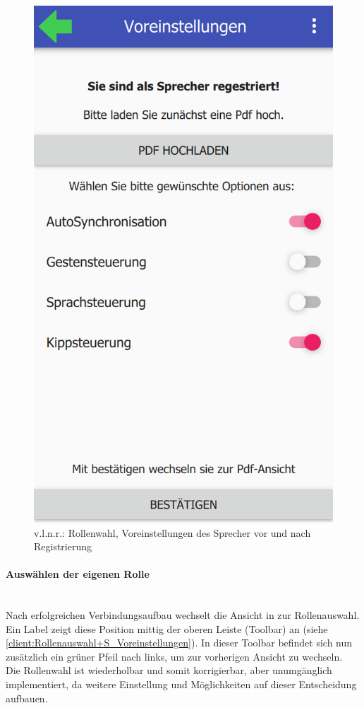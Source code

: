 \begin{figure}[ht!]
\begin{minipage}{0.31\linewidth}
		\includegraphics[scale=0.5]{GUI/Bilder/3_S_5_Voreinstellung.PNG}
	\end{minipage}
	\caption{v.l.n.r.: Rollenwahl, Voreinstellungen des Sprecher vor und nach Registrierung{\tiny}}
	\label{client:Rollenauswahl+S_Voreinstellungen}
\end{figure}

\newpage

\paragraph{Auswählen der eigenen Rolle}$\;$\\
Nach erfolgreichen Verbindungsaufbau wechselt die Ansicht in zur Rollenauswahl. Ein Label zeigt diese Position mittig der oberen Leiste (Toolbar) an (siehe \autoref{client:Rollenauswahl+S_Voreinstellungen}).
In dieser Toolbar befindet sich nun zusätzlich ein grüner Pfeil nach links, um zur vorherigen Ansicht zu wechseln.
\\Die Rollenwahl ist wiederholbar und somit korrigierbar, aber unumgänglich implementiert, da weitere Einstellung und Möglichkeiten auf dieser Entscheidung aufbauen.
